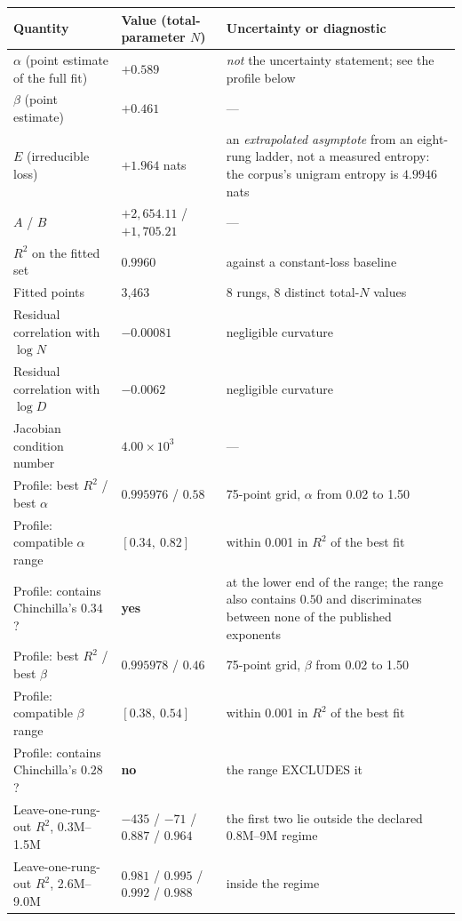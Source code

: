 \documentclass[11pt,a4paper]{article}
\begin{document}
\begin{table}[H]
\centering
\small
\begin{tabular}{L{4.8cm}R{4.4cm}L{4.6cm}}
\toprule
Quantity & Value (total-parameter $N$) & Uncertainty or diagnostic \\
\midrule
$\alpha$ (point estimate of the full fit) & $+0.589$ & \emph{not} the uncertainty statement; see the profile below \\
$\beta$ (point estimate) & $+0.461$ & --- \\
$E$ (irreducible loss) & $+1.964$ nats & an \emph{extrapolated asymptote} from an eight-rung ladder, not a measured entropy: the corpus's unigram entropy is $4.9946$ nats \\
$A$ / $B$ & $+2{,}654.11$ / $+1{,}705.21$ & --- \\
$R^2$ on the fitted set & $0.9960$ & against a constant-loss baseline \\
Fitted points & 3,463 & 8 rungs, 8 distinct total-$N$ values \\
Residual correlation with $\log N$ & $-0.00081$ & negligible curvature \\
Residual correlation with $\log D$ & $-0.0062$ & negligible curvature \\
Jacobian condition number & $4.00\times10^{3}$ & --- \\
\midrule
Profile: best $R^2$ / best $\alpha$ & $0.995976$ / $0.58$ & 75-point grid, $\alpha$ from 0.02 to 1.50 \\
Profile: compatible $\alpha$ range & $[0.34,\ 0.82]$ & within 0.001 in $R^2$ of the best fit \\
Profile: contains Chinchilla's $0.34$? & \textbf{yes} & at the lower end of the range; the range also contains $0.50$ and discriminates between none of the published exponents \\
Profile: best $R^2$ / best $\beta$ & $0.995978$ / $0.46$ & 75-point grid, $\beta$ from 0.02 to 1.50 \\
Profile: compatible $\beta$ range & $[0.38,\ 0.54]$ & within 0.001 in $R^2$ of the best fit \\
Profile: contains Chinchilla's $0.28$? & \textbf{no} & the range EXCLUDES it \\
\midrule
Leave-one-rung-out $R^2$, 0.3M--1.5M & $-435$ / $-71$ / $0.887$ / $0.964$ & the first two lie outside the declared 0.8M--9M regime \\
Leave-one-rung-out $R^2$, 2.6M--9.0M & $0.981$ / $0.995$ / $0.992$ / $0.988$ & inside the regime \\

\end{tabular}
\end{table}
\end{document}
